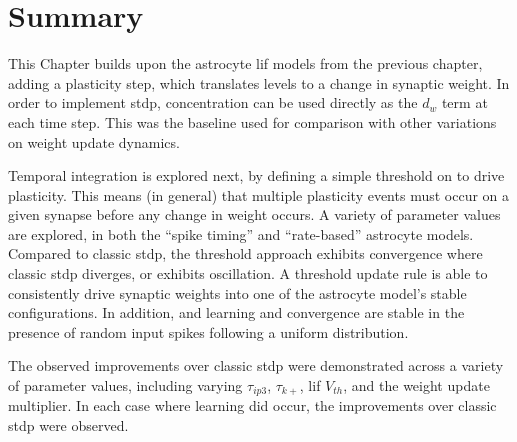

\section{Summary}

This Chapter builds upon the astrocyte \gls{lif} models from the previous
chapter, adding a plasticity step, which translates \ca levels to a change in
synaptic weight. In order to implement \gls{stdp}, \ca concentration can be used
directly as the $d_w$ term at each time step. This was the baseline used for
comparison with other variations on weight update dynamics.

Temporal integration is explored next, by defining a simple threshold on
\ca to drive plasticity. This means (in general) that multiple plasticity events
must occur on a given synapse before any change in weight occurs. A variety of
parameter values are explored, in both the ``spike timing'' and ``rate-based''
astrocyte models. Compared to classic \gls{stdp}, the threshold approach exhibits
convergence where classic \gls{stdp} diverges, or exhibits oscillation. A threshold
update rule is able to consistently drive synaptic weights into one of the
astrocyte model's stable configurations. In addition, and learning and
convergence are stable in the presence of random input spikes following a
uniform distribution.

The observed improvements over classic \gls{stdp} were demonstrated across a variety
of parameter values, including varying $\tau_{ip3}$, $\tau_{k+}$, \gls{lif} $V_{th}$,
and the weight update multiplier. In each case where learning did occur, the
improvements over classic \gls{stdp} were observed.

